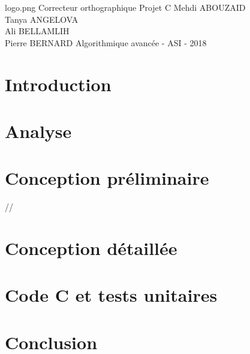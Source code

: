 \documentclass[11pt,a4paper]{article}
\begin{document}
\PageDeGarde	
{logo.png} %
{Correcteur orthographique} %
{Projet C} %
{Mehdi ABOUZAID \\
Tanya ANGELOVA \\
Ali BELLAMLIH \\
Pierre BERNARD} %
{Algorithmique avancée - ASI - 2018} %


\tableofcontents

\newpage
\section{Introduction}


\newpage
\section{Analyse}


\newpage
\section{Conception préliminaire}
//

\newpage
\section{Conception détaillée}


\newpage
\section{Code C et tests unitaires}


\newpage
\section{Conclusion}

\end{document}
